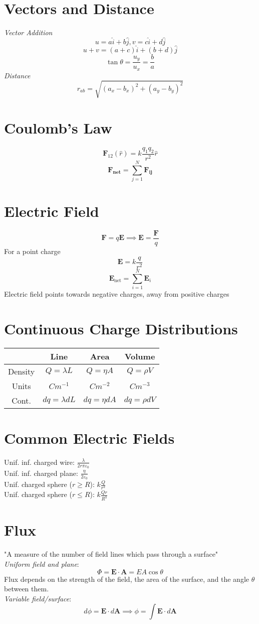 \section{Vectors and Distance}
\emph{Vector Addition}
$$u=a\hat{i}+b\hat{j}, v=c\hat{i}+d\hat{j}$$
$$u+v=(a+c)\hat{i}+(b+d)\hat{j}$$
$$\tan{\theta}=\frac{u_y}{u_x}=\frac{b}{a}$$
\emph{Distance}
$$r_{ab}=\sqrt{(a_x-b_x)^2+(a_y-b_y)^2}$$
\section{Coulomb's Law}
$$\mathbf{F}_{12}(\hat{r}) = k\frac{q_1q_2}{r^2}\hat{r}$$
$$\mathbf{F_{\text{net}}} = \sum_{j=1}^N\mathbf{F_{ij}}$$
\section{Electric Field}
$$\mathbf{F}=q\mathbf{E}\implies \mathbf{E}=\frac{\mathbf{F}}{q}$$
For a point charge
$$\mathbf{E}=k\frac{q}{r^2}$$
$$\mathbf{E}_{\text{net}}=\sum_{i=1}^N\mathbf{E}_i$$
Electric field points towards negative charges, away from positive charges
\section{Continuous Charge Distributions}
\begin{table}[H]
    \scriptsize
    \centering
    \begin{tabular}{c|c|c|c}
        & Line & Area & Volume\\
        \hline
        Density &  $Q=\lambda L$ & $Q=\eta A$ & $Q=\rho V$\\
        \hline
        Units &  $Cm^{-1}$ & $Cm^{-2}$ & $Cm^{-3}$\\
        \hline
        Cont. &  $dq=\lambda dL$ & $dq = \eta dA$ & $dq = \rho dV$
    \end{tabular}
\end{table}
\section{Common Electric Fields}

Unif. inf. charged wire: $\frac{\lambda}{2r\pi\varepsilon_0}$\\
Unif. inf. charged plane: $\frac{\eta}{2\varepsilon_0}$\\
Unif. charged sphere ($r\geq R$): $k\frac{Q}{r^2}$\\
Unif. charged sphere ($r\leq R$): $k\frac{Qr}{R^3}$

\section{Flux}
"A measure of the number of field lines which pass through a surface"\\
\emph{Uniform field and plane}:
$$\Phi = \mathbf{E}\cdot \mathbf{A}=EA\cos{\theta}$$
Flux depends on the strength  of the field, the area  of the surface, and the angle $\theta$ between them.\\
\emph{Variable field/surface}:\\
$$d\phi=\mathbf{E}\cdot d\mathbf{A}\implies\phi=\int\mathbf{E}\cdot d\mathbf{A}$$
